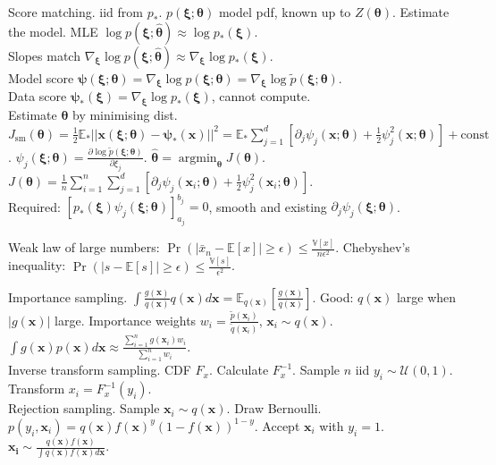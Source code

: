 \documentclass[twocolumn]{article}
\DeclareMathOperator*{\argmin}{argmin}
\begin{document}
Score matching. iid from $p_*$. $p(\bm{\xi};\bm{\theta})$ model pdf, known up to $Z(\bm{\theta})$. Estimate the model. MLE $\log p(\bm{\xi};\bm{\hat{\theta}})\approx\log p_*(\bm{\xi})$.\\
Slopes match $\nabla_{\bm{\xi}}\log p(\bm{\xi};\bm{\hat{\theta}})\approx\nabla_{\bm{\xi}}\log p_*(\bm{\xi})$.\\
Model score $\bm{\psi}(\bm{\xi};\bm{\theta})=\nabla_{\bm{\xi}}\log p(\bm{\xi};\bm{\theta})=\nabla_{\bm{\xi}}\log \tilde{p}(\bm{\xi};\bm{\theta})$.\\
Data score $\bm{\psi}_*(\bm{\xi})=\nabla_{\bm{\xi}}\log p_*(\bm{\xi})$, cannot compute.\\
Estimate $\bm{\theta}$ by minimising dist. $J_{\text{sm}}(\bm{\theta})=\frac{1}{2}\mathbb{E}_*||\mathbf{x}(\bm{\xi};\bm{\theta})-\bm{\psi}_*(\mathbf{x})||^2=\mathbb{E}_*\sum_{j=1}^d[\partial_j\psi_j(\mathbf{x};\bm{\theta})+\frac{1}{2}\psi_j^2(\mathbf{x};\bm{\theta})]+\text{const}$. $\psi_j(\bm{\xi};\mathbf{\theta})=\frac{\partial\log\tilde{p}(\bm{\xi};\bm{\theta})}{\partial\xi_j}$.
$\bm{\hat{\theta}}=\argmin_{\bm{\theta}}J(\bm{\theta})$. $J(\bm{\theta})=\frac{1}{n}\sum_{i=1}^n\sum_{j=1}^d[\partial_j\psi_j(\mathbf{x}_i;\bm{\theta})+\frac{1}{2}\psi_j^2(\mathbf{x}_i;\bm{\theta})]$.\\
Required: $[p_*(\bm{\xi})\psi_j(\bm{\xi};\bm{\theta})]_{a_j}^{b_j}=0$, smooth and existing $\partial_j\psi_j(\bm{\xi};\bm{\theta})$.

Weak law of large numbers: $\operatorname{Pr}(|\bar{x}_n-\mathbb{E}[x]|\ge\epsilon)\le\frac{\mathbb{V}[x]}{n\epsilon^2}$. Chebyshev's inequality: $\operatorname{Pr}(|s-\mathbb{E}[s]|\ge\epsilon)\le\frac{\mathbb{V}[s]}{\epsilon^2}$.

Importance sampling. $\int\frac{g(\mathbf{x})}{q(\mathbf{x})}q(\mathbf{x})d\mathbf{x}=\mathbb{E}_{q(\mathbf{x})}[\frac{g(\mathbf{x})}{q(\mathbf{x})}]$. Good: $q(\mathbf{x})$ large when $|g(\mathbf{x})|$ large. Importance weights $w_i=\frac{\tilde{p}(\mathbf{x}_i)}{\tilde{q}(\mathbf{x}_i)}$, $\mathbf{x}_i\sim q(\mathbf{x})$. $\int g(\mathbf{x})p(\mathbf{x})d\mathbf{x}\approx\frac{\sum_{i=1}^n g(\mathbf{x}_i)w_i}{\sum_{i=1}^n w_i}$.\\
Inverse transform sampling. CDF $F_x$. Calculate $F_x^{-1}$. Sample $n$ iid $y_i\sim\mathcal{U}(0,1)$. Transform $x_i=F_x^{-1}(y_i)$.\\
Rejection sampling. Sample $\mathbf{x}_i\sim q(\mathbf{x})$. Draw Bernoulli. $p(y_i,\mathbf{x}_i)=q(\mathbf{x})f(\mathbf{x})^y(1-f(\mathbf{x}))^{1-y}$. Accept $\mathbf{x}_i$ with $y_i=1$. $\mathbf{x_i}\sim\frac{q(\mathbf{x})f(\mathbf{x})}{\int q(\mathbf{x})f(\mathbf{x})d\mathbf{x}}$.
\end{document}

